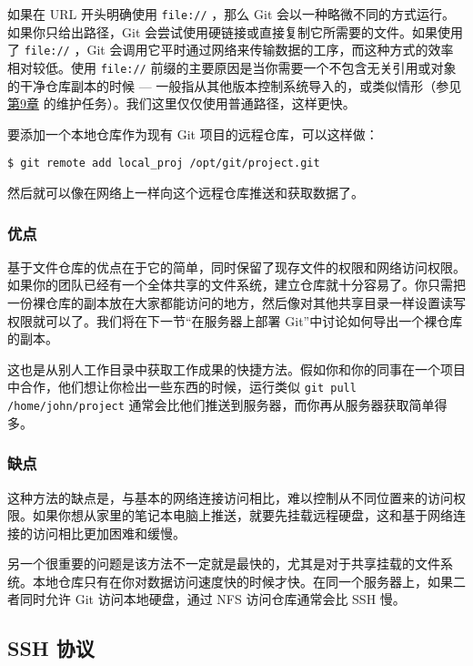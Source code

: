 \documentclass[a4paper]{book}
\newcommand{\prechap}{第}
\newcommand{\postchap}{章}
\newcommand{\chapref}[1]{\hyperref[chap:#1]{\prechap #1\postchap}}
\begin{document}
如果在 URL 开头明确使用 \texttt{file://} ，那么 Git 会以一种略微不同的方式运行。如果你只给出路径，Git 会尝试使用硬链接或直接复制它所需要的文件。如果使用了 \texttt{file://} ，Git 会调用它平时通过网络来传输数据的工序，而这种方式的效率相对较低。使用 \texttt{file://} 前缀的主要原因是当你需要一个不包含无关引用或对象的干净仓库副本的时候 --- 一般指从其他版本控制系统导入的，或类似情形（参见\chapref{9} 的维护任务）。我们这里仅仅使用普通路径，这样更快。

要添加一个本地仓库作为现有 Git 项目的远程仓库，可以这样做：

\begin{shaded}\begin{verbatim}
$ git remote add local_proj /opt/git/project.git
\end{verbatim}\end{shaded}

然后就可以像在网络上一样向这个远程仓库推送和获取数据了。

\subsubsection{优点}

基于文件仓库的优点在于它的简单，同时保留了现存文件的权限和网络访问权限。如果你的团队已经有一个全体共享的文件系统，建立仓库就十分容易了。你只需把一份裸仓库的副本放在大家都能访问的地方，然后像对其他共享目录一样设置读写权限就可以了。我们将在下一节“在服务器上部署 Git”中讨论如何导出一个裸仓库的副本。

这也是从别人工作目录中获取工作成果的快捷方法。假如你和你的同事在一个项目中合作，他们想让你检出一些东西的时候，运行类似 \texttt{git pull /home/john/project} 通常会比他们推送到服务器，而你再从服务器获取简单得多。

\subsubsection{缺点}

这种方法的缺点是，与基本的网络连接访问相比，难以控制从不同位置来的访问权限。如果你想从家里的笔记本电脑上推送，就要先挂载远程硬盘，这和基于网络连接的访问相比更加困难和缓慢。

另一个很重要的问题是该方法不一定就是最快的，尤其是对于共享挂载的文件系统。本地仓库只有在你对数据访问速度快的时候才快。在同一个服务器上，如果二者同时允许 Git 访问本地硬盘，通过 NFS 访问仓库通常会比 SSH 慢。

\subsection{SSH 协议}
\end{document}
